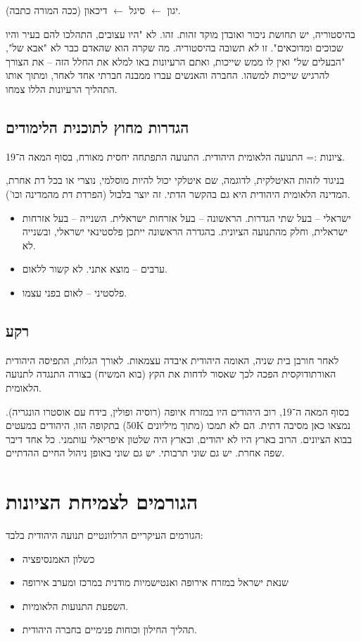 \documentclass[a4paper]{book}
\begin{document}
	יגון $\leftarrow$ סיגל $\leftarrow$ דיכאון (ככה המורה כתבה). 
	
	בהיסטוריה, יש תחושת ניכור ואובדן מוקד זהות. זהו. לא "היו עצובים, התהלכו להם בעיר והיו שכוכים ומדוכאים". זו \textit{לא} תשובה בהיסטוריה. מה שקרה הוא שהאדם כבר לא "אבא של", "הבעלים של" ואין לו ממש שייכות, ואתם הרעיונות באו למלא את החלל הזה – את הצורך להרגיש שייכות למשהו. החברה והאנשים עברו ממבנה חברתי אחד לאחר, ומתוך אותו התהליך הרעיונות הללו צמחו. 
	
	\subsection{הגדרות מחוץ לתוכנית הלימודים}
	ציונות := התנועה הלאומית היהודית. התנועה התפתחה יחסית מאורח, בסוף המאה ה־19. 
	
	בניגוד לזהות האיטלקית, לדוגמה, שם איטלקי יכול להיות מוסלמי, נוצרי או בכל דת אחרת, המדינה הלאומית היהודית היא גם בהקשר הדתי. זה יוצר בלבול (הפרדת דת מהמדינה וכו'). 
	
	\begin{itemize}
		\item ישראלי – בעל שתי הגדרות. הראשונה – בעל אזרחות ישראלית. השנייה – בעל אזרחות ישראלית, וחלק מהתנועה הציונית. בהגדרה הראשונה ייתכן פלסטינאי ישראלי, ובשנייה לא. 
		\item ערבים – מוצא אתני. לא קשור ללאום. 
		\item פלסטיני – לאום בפני עצמו. 
	\end{itemize}
	
	\subsection{רקע}
	לאחר חורבן בית שניה, האומה היהודית איבדה עצמאות. לאורך הגלות, התפיסה היהודית האורתודוקסית הפכה לכך שאסור לדחות את הקץ (בוא המשיח) בצורה התנגדה לתנועה הלאומית. 
	
	בסוף המאה ה־19, רוב היהודים היו במזרח איופה (רוסיה ופולין, בידח עם אוסטרו הונגריה). בתקופה הזו, היהודים במעטים (50K מתוך מיליונים) נמצאו כאן מסיבה דתית. הם לא תמכו בבוא הציונים. הרוב בארץ היו לא יהודים, ובארץ היה שלטון איפריאלי עותמני. כל אחד דיבר שפה אחרת. יש גם שוני תרבותי. יש גם שוני באופן ניהול החיים ההדתיים. 
	
	\section{הגורמים לצמיחת הציונות}
	הגורמים העיקריים הרלוונטיים תנועה היהודית בלבד: 
	\begin{itemize}
		\item כשלון האמנסיפציה
		\item שנאת ישראל במזרח אירופה ואנטישמיות מודנית במרכז ומערב אירופה
		\item השפעת התנועות הלאומיות. 
		\item תהליך החילון וכוחות פנימיים בחברה היהודית. 
	\end{itemize}
	
\end{document}
